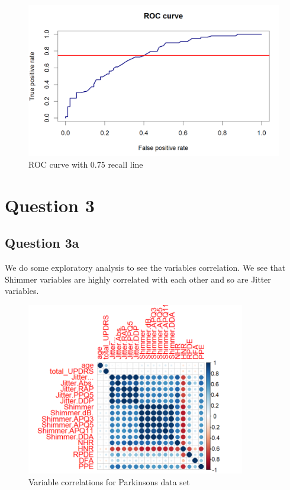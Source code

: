\documentclass[
]{article}
\begin{document}
\begin{figure}
\centering
\includegraphics[width=4.61458in,height=\textheight]{roc_curve_ipl.png}
\caption{ROC curve with 0.75 recall line}
\end{figure}

\hypertarget{question-3}{%
\section{Question 3}\label{question-3}}

\hypertarget{question-3a}{%
\subsection{Question 3a}\label{question-3a}}

We do some exploratory analysis to see the variables correlation. We see
that Shimmer variables are highly correlated with each other and so are
Jitter variables.

\begin{figure}
\centering
\includegraphics[width=3.76042in,height=\textheight]{corr_parkinsons.png}
\caption{Variable correlations for Parkinsons data set}
\end{figure}
\end{document}
